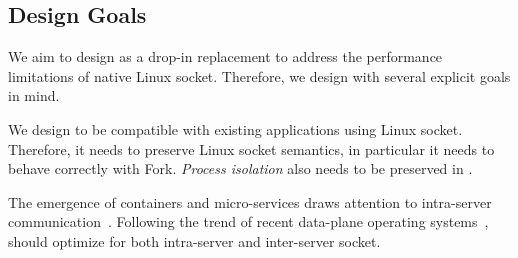 




\subsection{Design Goals}
\label{subsec:goals}
We aim to design \sys as a drop-in replacement to address the performance limitations of native Linux socket. Therefore, we design \sys{} with several explicit goals in mind.

We design \sys to be compatible with existing applications using Linux socket. Therefore, it needs to preserve Linux socket semantics, in particular it needs to behave correctly with Fork. \textit{Process isolation} also needs to be preserved in \sys.

The emergence of containers and micro-services draws attention to intra-server communication~\cite{bailis2016introducing}.
Following the trend of recent data-plane operating systems~\cite{peter2016arrakis,belay2017ix,freeflow}, 
\sys should optimize for both intra-server and inter-server socket.

